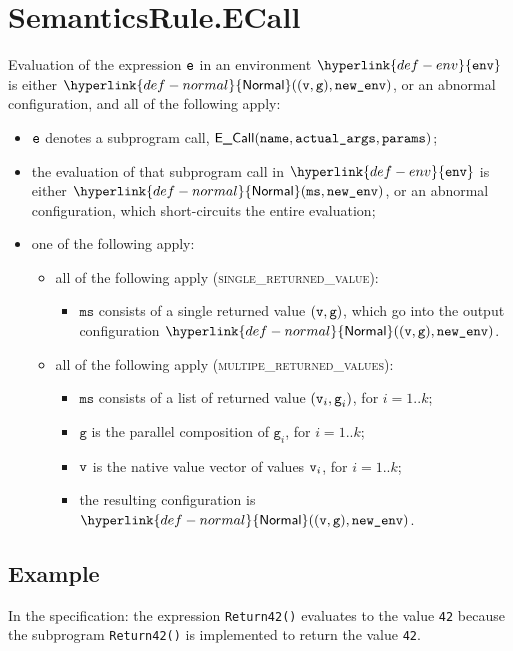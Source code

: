 \documentclass{book}
\newcommand\Normal[0]{\hyperlink{def-normal}{\textsf{Normal}}}
\newcommand\env[0]{\hyperlink{def-env}{\texttt{env}}}
\newcommand\vg[0]{\texttt{g}}
\newcommand\vms[0]{\texttt{ms}}
\newcommand\name[0]{\texttt{name}}
\newcommand\actualargs[0]{\texttt{actual\_args}}
\newcommand\params[0]{\texttt{params}}
\begin{document}
\section{SemanticsRule.ECall \label{sec:SemanticsRule.ECall}}
  Evaluation of the expression $\texttt{e}$ in an environment $\env$ is either $\Normal((\vv, \vg), \newenv)$,
  or an abnormal configuration, and all of the following apply:
  \begin{itemize}
    \item $\texttt{e}$ denotes a subprogram call, $\ECall(\name, \actualargs, \params)$;
    \item the evaluation of that subprogram call in $\env$ is either
    $\Normal(\vms, \newenv)$, or an abnormal configuration,
    which short-circuits the entire evaluation;
    \item one of the following apply:
    \begin{itemize}
      \item all of the following apply (\textsc{single\_returned\_value}):
      \begin{itemize}
        \item $\vms$ consists of a single returned value $(\vv,\vg)$,
        which go into the output configuration $\Normal((\vv, \vg), \newenv)$.
      \end{itemize}

      \item all of the following apply (\textsc{multipe\_returned\_values}):
      \begin{itemize}
        \item $\vms$ consists of a list of returned value $(\vv_i,\vg_i)$, for $i=1..k$;
        \item $\vg$ is the parallel composition of $\vg_i$, for $i=1..k$;
        \item $\texttt{v}$ is the native value vector of values $\texttt{v}_i$, for $i=1..k$;
        \item the resulting configuration is $\Normal((\vv, \vg), \newenv)$.
      \end{itemize}
    \end{itemize}
  \end{itemize}

  \subsection{Example}
    In the specification:
    the expression \texttt{Return42()} evaluates to the value \texttt{42} because the
    subprogram \texttt{Return42()} is implemented to return the value \texttt{42}.
\end{document}
